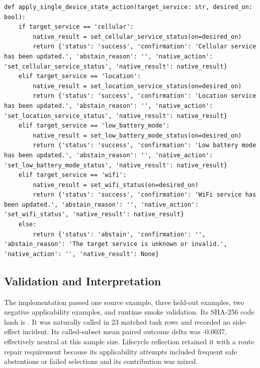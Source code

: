 \begin{lstlisting}[style=sagepython,caption={Accepted single-device-state native-action tool.},label={lst:sage-apply-device-state}]
def apply_single_device_state_action(target_service: str, desired_on: bool):
    if target_service == 'cellular':
        native_result = set_cellular_service_status(on=desired_on)
        return {'status': 'success', 'confirmation': 'Cellular service has been updated.', 'abstain_reason': '', 'native_action': 'set_cellular_service_status', 'native_result': native_result}
    elif target_service == 'location':
        native_result = set_location_service_status(on=desired_on)
        return {'status': 'success', 'confirmation': 'Location service has been updated.', 'abstain_reason': '', 'native_action': 'set_location_service_status', 'native_result': native_result}
    elif target_service == 'low_battery_mode':
        native_result = set_low_battery_mode_status(on=desired_on)
        return {'status': 'success', 'confirmation': 'Low battery mode has been updated.', 'abstain_reason': '', 'native_action': 'set_low_battery_mode_status', 'native_result': native_result}
    elif target_service == 'wifi':
        native_result = set_wifi_status(on=desired_on)
        return {'status': 'success', 'confirmation': 'WiFi service has been updated.', 'abstain_reason': '', 'native_action': 'set_wifi_status', 'native_result': native_result}
    else:
        return {'status': 'abstain', 'confirmation': '', 'abstain_reason': 'The target service is unknown or invalid.', 'native_action': '', 'native_result': None}
\end{lstlisting}

\subsection{Validation and
Interpretation}\label{validation-and-interpretation-2}

The implementation passed one source example, three held-out examples,
two negative applicability examples, and runtime smoke validation. Its
SHA-256 code hash is
.
It was naturally called in 23 matched task rows and recorded no
side-effect incident. Its called-subset mean paired outcome delta was
-0.0037, effectively neutral at this sample size. Lifecycle reflection
retained it with a route repair requirement because its applicability
attempts included frequent safe abstentions or failed selections and its
contribution was mixed.


